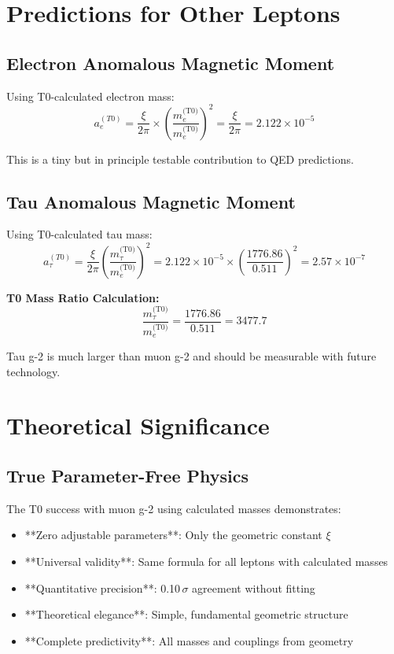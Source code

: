 \documentclass[12pt,a4paper]{article}
\numberwithin{equation}{section}
\begin{document}
	\section{Predictions for Other Leptons}
	
	\subsection{Electron Anomalous Magnetic Moment}
	
	Using T0-calculated electron mass:
	\begin{equation}
		a_e^{(T0)} = \frac{\xi}{2\pi} \times \left(\frac{m_e^{\text{(T0)}}}{m_e^{\text{(T0)}}}\right)^2 = \frac{\xi}{2\pi} = 2.122 \times 10^{-5}
	\end{equation}
	
	This is a tiny but in principle testable contribution to QED predictions.
	
	\subsection{Tau Anomalous Magnetic Moment}
	
	Using T0-calculated tau mass:
	\begin{equation}
		a_\tau^{(T0)} = \frac{\xi}{2\pi} \left(\frac{m_\tau^{\text{(T0)}}}{m_e^{\text{(T0)}}}\right)^2 = 2.122 \times 10^{-5} \times \left(\frac{1776.86}{0.511}\right)^2 = 2.57 \times 10^{-7}
	\end{equation}
	
	\begin{t0calculation}
		\textbf{T0 Mass Ratio Calculation:}
		\begin{equation}
			\frac{m_\tau^{\text{(T0)}}}{m_e^{\text{(T0)}}} = \frac{1776.86}{0.511} = 3477.7
		\end{equation}
		
		Tau g-2 is much larger than muon g-2 and should be measurable with future technology.
	\end{t0calculation}
	
	\section{Theoretical Significance}
	
	\subsection{True Parameter-Free Physics}
	
	The T0 success with muon g-2 using calculated masses demonstrates:
	\begin{itemize}
		\item **Zero adjustable parameters**: Only the geometric constant $\xi$
		\item **Universal validity**: Same formula for all leptons with calculated masses
		\item **Quantitative precision**: 0.10$\,\sigma$ agreement without fitting
		\item **Theoretical elegance**: Simple, fundamental geometric structure
		\item **Complete predictivity**: All masses and couplings from geometry
	\end{itemize}
	
\end{document}
